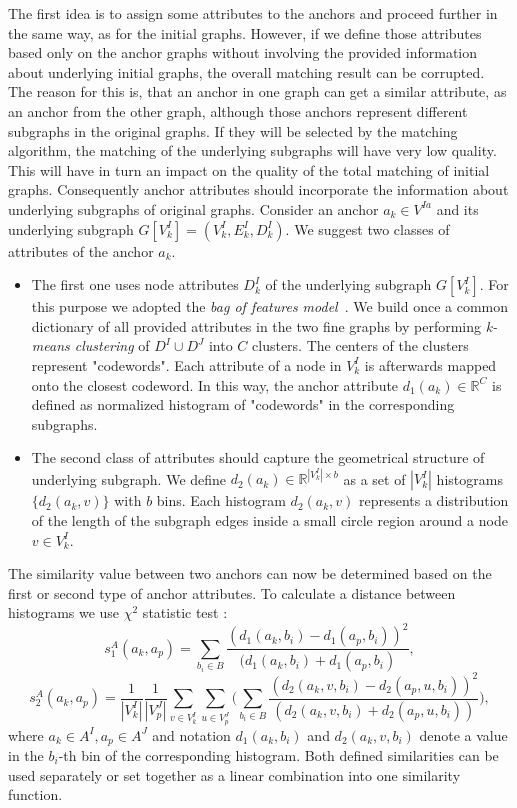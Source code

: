 The first idea is to assign some attributes to the anchors and proceed further in the same way, as for the initial graphs. However, if we define those attributes based only on the anchor graphs without involving the provided information about underlying initial graphs, the overall matching result can be corrupted. The reason for this is, that an anchor in one graph can get a similar attribute, as an anchor from the other graph, although those anchors represent different subgraphs in the original graphs. If they will be selected by the matching algorithm, the matching of the underlying subgraphs will have very low quality. This will have in turn an impact on the quality of the total matching of initial graphs. Consequently anchor attributes should incorporate the information about underlying subgraphs of original graphs.
Consider an anchor $a_k\in V^{Ia}$ and its underlying subgraph $G[V^I_k]=(V^I_k,E^I_k,D^I_k)$. We suggest two classes of attributes of the anchor $a_k$. 
\begin{itemize}
\item The first one uses node attributes $D^I_k$ of the underlying subgraph $G[V^I_k]$. For this purpose we adopted the \emph{bag of features model}~\cite{BoF_Leung2001}. We build once a common dictionary of all provided attributes in the two fine graphs by performing \emph{k-means clustering} of $D^I\cup D^J$ into $C$ clusters. The centers of the clusters represent "codewords". Each attribute of a node in $V^I_k$ is afterwards mapped onto the closest codeword. In this way, the anchor attribute $d_1(a_k)\in\mathbb{R}^C$ is defined as normalized histogram of "codewords" in the corresponding subgraphs.

\item The second class of attributes should capture the geometrical structure of underlying subgraph. We define $d_2(a_k)\in\mathbb{R}^{|V^I_k|\times b}$ as a set of $|V^I_k|$ histograms $\{d_2(a_k,v)\}$ with $b$ bins. Each histogram $d_2(a_k,v)$ represents a distribution of the length of the subgraph edges inside a small circle region around a node $v\in V^I_k$. 
\end{itemize}
The similarity value between two anchors can now be determined based on the first or second type of anchor attributes. To calculate a distance between histograms we use $\chi^2$ statistic test \cite{Weken2004_ChiSqTest}:
\begin{equation}
s^A_1(a_k, a_p) = \sum_{b_i\in B}\frac{(d_1(a_k,b_i)-d_1(a_p,b_i))^2}{(d_1(a_k,b_i)+d_1(a_p,b_i)},
\end{equation}
\begin{equation}
s^A_2(a_k, a_p) = \frac{1}{|V^I_k|}\frac{1}{|V^J_p|}\sum_{v\in V^I_k}\sum_{u\in V^J_p} \big(\sum_{b_i\in B}\frac{(d_2(a_k,v,b_i)-d_2(a_p,u,b_i))^2}{(d_2(a_k,v,b_i)+d_2(a_p,u,b_i))}\big),
\end{equation}
where $a_k\in A^I, a_p\in A^J$ and notation $d_1(a_k,b_i)$ and $d_2(a_k,v,b_i)$ denote a value in the $b_i$-th bin of the corresponding histogram. 
Both defined similarities can be used separately or set together as a linear combination into one similarity function.

